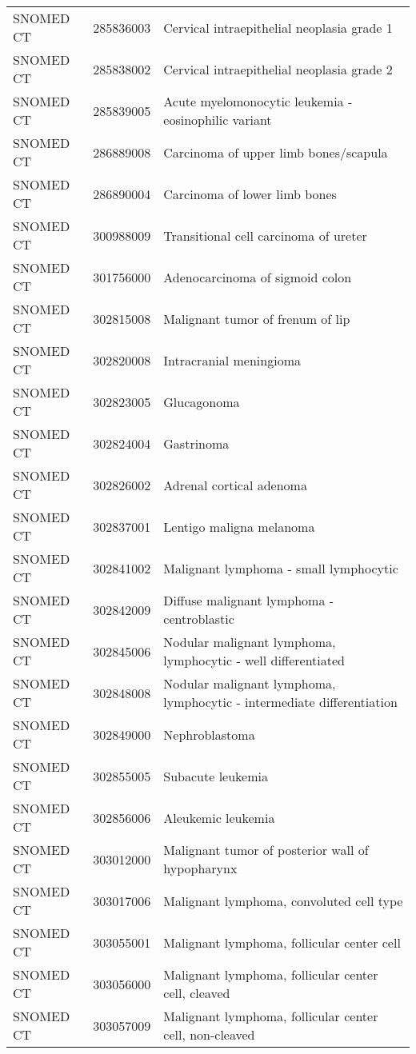 \begin{longtable}{p{}p{}p{}}
  SNOMED CT & 285836003 & Cervical intraepithelial neoplasia grade 1 \\ 
  SNOMED CT & 285838002 & Cervical intraepithelial neoplasia grade 2 \\ 
  SNOMED CT & 285839005 & Acute myelomonocytic leukemia - eosinophilic variant \\ 
  SNOMED CT & 286889008 & Carcinoma of upper limb bones/scapula \\ 
  SNOMED CT & 286890004 & Carcinoma of lower limb bones \\ 
  SNOMED CT & 300988009 & Transitional cell carcinoma of ureter \\ 
  SNOMED CT & 301756000 & Adenocarcinoma of sigmoid colon \\ 
  SNOMED CT & 302815008 & Malignant tumor of frenum of lip \\ 
  SNOMED CT & 302820008 & Intracranial meningioma \\ 
  SNOMED CT & 302823005 & Glucagonoma \\ 
  SNOMED CT & 302824004 & Gastrinoma \\ 
  SNOMED CT & 302826002 & Adrenal cortical adenoma \\ 
  SNOMED CT & 302837001 & Lentigo maligna melanoma \\ 
  SNOMED CT & 302841002 & Malignant lymphoma - small lymphocytic \\ 
  SNOMED CT & 302842009 & Diffuse malignant lymphoma - centroblastic \\ 
  SNOMED CT & 302845006 & Nodular malignant lymphoma, lymphocytic - well differentiated \\ 
  SNOMED CT & 302848008 & Nodular malignant lymphoma, lymphocytic - intermediate differentiation \\ 
  SNOMED CT & 302849000 & Nephroblastoma \\ 
  SNOMED CT & 302855005 & Subacute leukemia \\ 
  SNOMED CT & 302856006 & Aleukemic leukemia \\ 
  SNOMED CT & 303012000 & Malignant tumor of posterior wall of hypopharynx \\ 
  SNOMED CT & 303017006 & Malignant lymphoma, convoluted cell type \\ 
  SNOMED CT & 303055001 & Malignant lymphoma, follicular center cell \\ 
  SNOMED CT & 303056000 & Malignant lymphoma, follicular center cell, cleaved \\ 
  SNOMED CT & 303057009 & Malignant lymphoma, follicular center cell, non-cleaved \\ 

\end{longtable}
